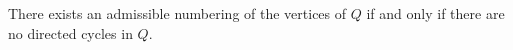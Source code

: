 There exists an admissible numbering of the vertices of $Q$ if and only if
there are no directed cycles in $Q$.

